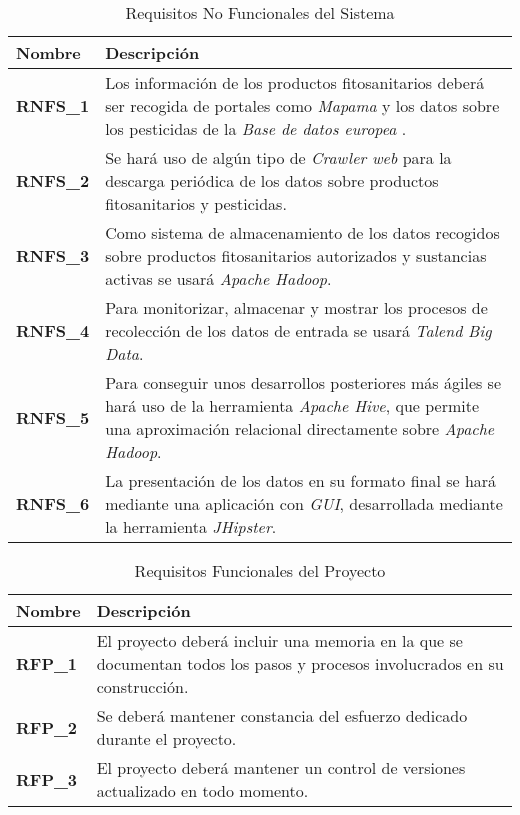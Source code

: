 \begin{table}[!h]
\centering
\bgroup
\def\arraystretch{1.3}
\begin{tabular}{l p{13cm}}
\toprule
\textbf{Nombre} & \textbf{Descripción} \\
 \midrule
\textbf{RNFS\_1} & 
Los información de los productos fitosanitarios deberá ser recogida de portales como \textit{Mapama} \cite{mapama} y los datos sobre los pesticidas de la \textit{Base de datos europea} \cite{pesticides_eu}.
 \\
\textbf{RNFS\_2} & 
Se hará uso de algún tipo de \textit{Crawler web} \cite{wikicrawler} para la descarga periódica de los datos sobre productos fitosanitarios y pesticidas.
 \\
\textbf{RNFS\_3} & 
Como sistema de almacenamiento de los datos recogidos sobre productos fitosanitarios autorizados y sustancias activas se usará \textit{Apache Hadoop}.
 \\
\textbf{RNFS\_4} & 
Para monitorizar, almacenar y mostrar los procesos de recolección de los datos de entrada se usará \textit{Talend Big Data}. 
 \\
\textbf{RNFS\_5} & 
Para conseguir unos desarrollos posteriores más ágiles se hará uso de la herramienta \textit{Apache Hive}, que permite una aproximación relacional directamente sobre \textit{Apache Hadoop}.
 \\
\textbf{RNFS\_6} & 
La presentación de los datos en su formato final se hará mediante una aplicación con \textit{GUI}, desarrollada mediante la herramienta \textit{JHipster}.
 \\
\bottomrule
\end{tabular}
\egroup
\caption{Requisitos No Funcionales del Sistema}
\label{tab:req_no_func_sist}
\end{table}

\newpage
\begin{table}[t]
\begin{tabular}{l p{13cm}}
\toprule
\textbf{Nombre} & \textbf{Descripción} \\
 \midrule
\textbf{RFP\_1} & 
El proyecto deberá incluir una memoria en la que se documentan todos los pasos y procesos involucrados en su construcción.
 \\
\textbf{RFP\_2} & 
Se deberá mantener constancia del esfuerzo dedicado durante el proyecto.
 \\
\textbf{RFP\_3} &
El proyecto deberá mantener un control de versiones actualizado en todo momento. 
 \\
\bottomrule
\end{tabular}
\caption{Requisitos Funcionales del Proyecto}
\vspace*{-11pt}
\label{tab:req_func_proy}
\end{table}












 


















